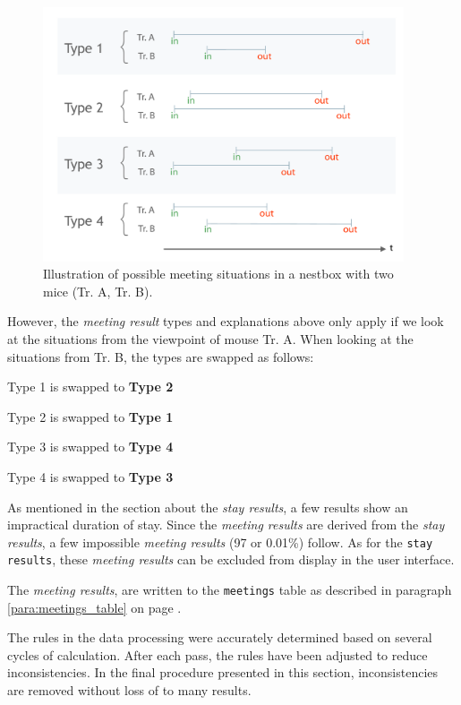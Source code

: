 \begin{figure}[htpb]
\begin{center}
  \includegraphics[width=0.95\textwidth]{assets/pdf/meeting_types_schema.pdf}
  \caption[Meeting results types illustration]{Illustration of possible meeting situations in a nestbox with two mice (Tr. A, Tr. B).}
  \label{fig:meeting_types}
\end{center}
\end{figure}

However, the \textit{meeting result} types and explanations above only apply if we look at the situations from the viewpoint of mouse Tr. A. When looking at the situations from Tr. B, the types are swapped as follows:

\begin{mylist}
\item Type 1 is swapped to \textbf{Type 2}   
\item Type 2 is swapped to \textbf{Type 1}
\item Type 3 is swapped to \textbf{Type 4} 
\item Type 4 is swapped to \textbf{Type 3}
\end{mylist}

As mentioned in the section about the \textit{stay results}, a few results show an impractical duration of stay. Since the \textit{meeting results} are derived from the \textit{stay results}, a few impossible \textit{meeting results} (97 or 0.01\%) follow. As for the \lstinline|stay results|, these \textit{meeting results} can be excluded from display in the user interface.

The \textit{meeting results}, are written to the \lstinline|meetings| table as described in paragraph \ref{para:meetings_table} on page \pageref{para:meetings_table}. 

The rules in the data processing were accurately determined based on several cycles of calculation. After each pass, the rules have been adjusted to reduce inconsistencies. In the final procedure presented in this section, inconsistencies are removed without loss of to many results.
